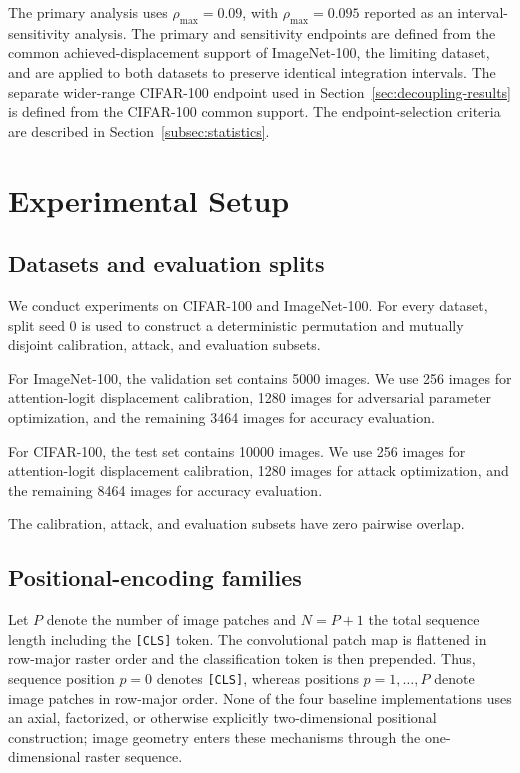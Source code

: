 \documentclass[preprint,12pt,authoryear]{elsarticle}
\begin{document}
The primary analysis uses $\rho_{\max}=0.09$, with
$\rho_{\max}=0.095$ reported as an interval-sensitivity analysis.
The primary and sensitivity endpoints are defined from the common
achieved-displacement support of ImageNet-100, the limiting dataset,
and are applied to both datasets to preserve identical integration
intervals. The separate wider-range CIFAR-100 endpoint used in
Section~\ref{sec:decoupling-results} is defined from the CIFAR-100
common support. The endpoint-selection criteria are described in
Section~\ref{subsec:statistics}.


\section{Experimental Setup}
\label{sec:experimental-setup}

\subsection{Datasets and evaluation splits}

We conduct experiments on CIFAR-100 and ImageNet-100. For every
dataset, split seed 0 is used to construct a deterministic permutation
and mutually disjoint calibration, attack, and evaluation subsets.

For ImageNet-100, the validation set contains 5000 images. We use 256
images for attention-logit displacement calibration, 1280 images for
adversarial parameter optimization, and the remaining 3464 images for
accuracy evaluation.

For CIFAR-100, the test set contains 10000 images. We use 256 images
for attention-logit displacement calibration, 1280 images for attack
optimization, and the remaining 8464 images for accuracy evaluation.

The calibration, attack, and evaluation subsets have zero pairwise
overlap.


\subsection{Positional-encoding families}

Let $P$ denote the number of image patches and $N=P+1$ the total
sequence length including the \texttt{[CLS]} token. The convolutional
patch map is flattened in row-major raster order and the classification
token is then prepended. Thus, sequence position $p=0$ denotes
\texttt{[CLS]}, whereas positions $p=1,\ldots,P$ denote image patches in
row-major order. None of the four baseline implementations uses an axial,
factorized, or otherwise explicitly two-dimensional positional
construction; image geometry enters these mechanisms through the
one-dimensional raster sequence.
\end{document}
